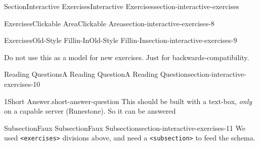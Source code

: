 \documentclass[twoside,10pt,]{article}
\newcommand{\blocktitlefont}{\relax}
\newcommand{\mono}[1]{\texttt{#1}}
\newlength{\fillinmaxwidth}
\newlength{\fillincontract}
\newlength{\charmaxwidth}\setlength{\charmaxwidth}{0.5em}
\newlength{\charminwidth}\setlength{\charminwidth}{0.1em}
\newlength{\fillinheight}
\newcommand{\fillintext}[1]{%
\setlength{\fillinmaxwidth}{#1\charmaxwidth}%
\setlength{\fillincontract}{#1\charminwidth}%
\setlength{\fillinheight}{\baselineskip}\addtolength{\fillinheight}{1.2pt}%
\strut\nobreak\leaders\vbox{\hrule width 0.3pt height 0.3pt \vskip -1.2pt}\hskip 1\fillinmaxwidth minus \fillincontract\nobreak\strut%
}
\numberwithin{equation}{section}
\begin{document}
\begin{sectionptx}{Section}{Interactive Exercises}{}{Interactive Exercises}{}{}{section-interactive-exercises}
\begin{exercises-subsection}{Exercises}{Clickable Area}{}{Clickable Area}{}{}{section-interactive-exercises-8}
\end{exercises-subsection}
%
%
\typeout{************************************************}
\typeout{************************************************}
%
\begin{exercises-subsection}{Exercises}{Old-Style Fillin-In}{}{Old-Style Fillin-In}{}{}{section-interactive-exercises-9}
\begin{introduction}{}%
Do not use this as a model for new exercises.  Just for backwards-compatibility.%
\end{introduction}%
%
\end{exercises-subsection}
%
%
\typeout{************************************************}
\typeout{************************************************}
%
\begin{reading-questions-subsection}{Reading Questions}{A Reading Question}{}{A Reading Question}{}{}{section-interactive-exercises-10}
\begin{divisionexercise}{1}{Short Answer.}{}{short-answer-question}%
This should be built with a text-box, \emph{only} on a capable server (Runestone).  So it can be answered%
\end{divisionexercise}%
\end{reading-questions-subsection}
%
%
\typeout{************************************************}
\typeout{************************************************}
%
\begin{subsectionptx}{Subsection}{Faux Subsection}{}{Faux Subsection}{}{}{section-interactive-exercises-11}
We used \mono{<exercises>} divisions above, and need a \mono{<subsection>} to feed the schema.%
\end{subsectionptx}
\end{sectionptx}
\end{document}
